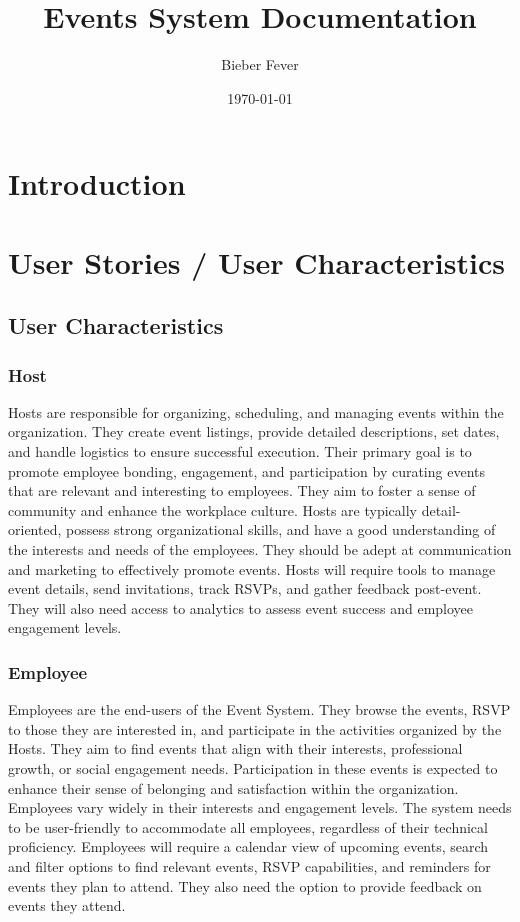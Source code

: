 \documentclass[a4paper,12pt]{article}
\title{Events System Documentation}
\author{Bieber Fever}
\date{\today}
\begin{document}
\maketitle
\tableofcontents

\section{Introduction}
\label{sec:introduction}

\section{User Stories / User Characteristics}
\label{sec:user-stories}

\subsection{User Characteristics}

\subsubsection{Host}
Hosts are responsible for organizing, scheduling, and managing events within the organization. 
They create event listings, provide detailed descriptions, set dates, and handle logistics to 
ensure successful execution. Their primary goal is to promote employee bonding, engagement, and 
participation by curating events that are relevant and interesting to employees. They aim to foster 
a sense of community and enhance the workplace culture. Hosts are typically detail-oriented, possess 
strong organizational skills, and have a good understanding of the interests and needs of the employees. 
They should be adept at communication and marketing to effectively promote events. Hosts will require 
tools to manage event details, send invitations, track RSVPs, and gather feedback post-event. They 
will also need access to analytics to assess event success and employee engagement levels. 

\subsubsection{Employee}
Employees are the end-users of the Event System. They browse the events, RSVP to those they are 
interested in, and participate in the activities organized by the Hosts. They aim to find events 
that align with their interests, professional growth, or social engagement needs. Participation 
in these events is expected to enhance their sense of belonging and satisfaction within the organization. 
Employees vary widely in their interests and engagement levels. The system needs to be user-friendly to accommodate 
all employees, regardless of their technical proficiency. Employees will require a calendar view of upcoming events, 
search and filter options to find relevant events, RSVP capabilities, and reminders for events they plan to attend. 
They also need the option to provide feedback on events they attend.
\end{document}
